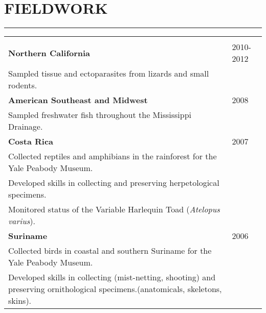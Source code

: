 \documentclass{article}
\begin{document}
\section*{FIELDWORK}
\vspace{-0.6cm}
\rule{470pt}{0.4pt}
\begin{tabular}{>{\everypar{\hangindent1cm}}p{}p{}}
\hfill\\
\textbf{Northern California} & \hfill 2010-2012\\
\hspace{4.5mm}Sampled tissue and ectoparasites from lizards and small rodents.\\
%
\textbf{American Southeast and Midwest} & \hfill 2008\\ 
\hspace{4.5mm}Sampled freshwater fish throughout the Mississippi Drainage.\\
%
\textbf{Costa Rica}  & \hfill  2007\\ 
\hspace{4.5mm}Collected reptiles and amphibians in the rainforest for the Yale Peabody Museum.\\ 
\hspace{4.5mm}Developed skills in collecting and preserving herpetological specimens.\\
\hspace{4.5mm}Monitored status of the Variable Harlequin Toad (\textit{Atelopus varius}).\\
%
\textbf{Suriname}  & \hfill  2006\\
\hspace{4.5mm}Collected birds in coastal and southern Suriname for the Yale Peabody Museum.\\ 
\hspace{4.5mm}Developed skills in collecting (mist-netting, shooting) and preserving ornithological specimens.(anatomicals, skeletons, skins).\\ 
\end{tabular}
\end{document}
